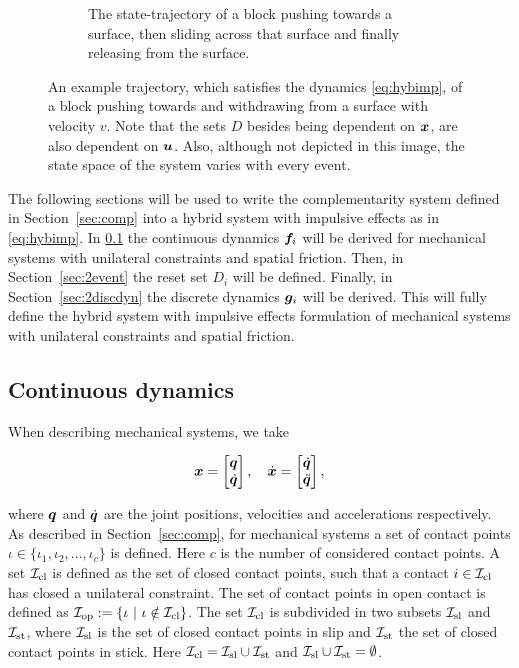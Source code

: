 \documentclass[../DC2017114Bouma.tex]{subfiles}
\begin{document}
\begin{figure}[h]
\begin{subfigure}[b]{\textwidth}
\caption{The state-trajectory of a block pushing towards a surface, then sliding across that surface and finally releasing from the surface.}
\label{fig:2exampletraj}
\end{subfigure}
\caption{An example trajectory, which satisfies the dynamics \eqref{eq:hybimp}, of a block pushing towards and withdrawing from a surface with velocity $v$.  Note that the sets $D$ besides being dependent on ${\boldsymbol{x}}$, are also dependent on ${\boldsymbol{u}}$. Also, although not depicted in this image, the state space of the system varies with every event.}
\label{fig:2example}
\end{figure}

The following sections will be used to write the complementarity system defined in Section~\ref{sec:comp} into a hybrid system with impulsive effects as in \eqref{eq:hybimp}. In \ref{sec:2contdyn} the continuous dynamics ${\boldsymbol{f}}_i$ will be derived for mechanical systems with unilateral constraints and spatial friction. Then, in Section~\ref{sec:2event} the reset set $D_i$ will be defined. Finally, in Section~\ref{sec:2discdyn} the discrete dynamics ${\boldsymbol{g}}_i$ will be derived. This will fully define the hybrid system with impulsive effects formulation of mechanical systems with unilateral constraints and spatial friction.

\subsection{Continuous dynamics}\label{sec:2contdyn}
When describing mechanical systems, we take 

\begin{align}
{\boldsymbol{x}} = \begin{bmatrix}
{\boldsymbol{q}}\\ \dot{{\boldsymbol{q}}}
\end{bmatrix},\quad
\dot{{\boldsymbol{x}}} = \begin{bmatrix}
\dot{{\boldsymbol{q}}}\\ \ddot{{\boldsymbol{q}}}
\end{bmatrix},
\end{align}

where ${\boldsymbol{q}}$ and $\dot{{\boldsymbol{q}}}$ are the joint positions, velocities and accelerations respectively. As described in Section~\ref{sec:comp}, for mechanical systems a set of contact points $\iota\in\{\iota_1,\iota_2,...,\iota_c\}$ is defined. Here $c$ is the number of considered contact points. A set $\mathcal{I}_{\text{cl}}$ is defined as the set of closed contact points, such that a contact $i\in\mathcal{I}_{\text{cl}}$ has closed a unilateral constraint. The set of contact points in open contact is defined as $\Ic_{\text{op}} := \{\iota\ |\ \iota\notin\Ic_{\text{cl}}\}$. The set $\mathcal{I}_{\text{cl}}$ is subdivided in two subsets $\mathcal{I}_{\text{sl}}$ and $\mathcal{I}_{\text{st}}$, where $\mathcal{I}_{\text{sl}}$ is the set of closed contact points in slip and $\mathcal{I}_{\text{st}}$ the set of closed contact points in stick. Here $\mathcal{I}_{\text{cl}} =\mathcal{I}_{\text{sl}}\cup\mathcal{I}_{\text{st}}$ and $\mathcal{I}_{\text{sl}}\cup\mathcal{I}_{\text{st}}=\emptyset$. 
\end{document}
